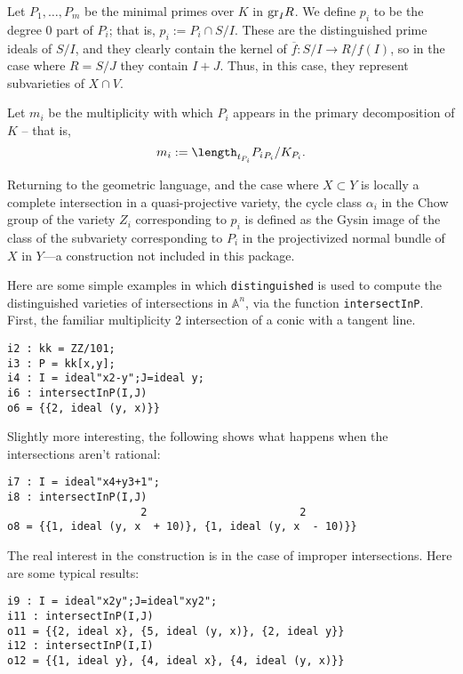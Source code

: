 \documentclass[twoside,12pt, leqno]{amsart}
\def\gr{{\rm gr}}
\begin{document}
\begin{normalsize}
Let $P_{1},\dots, P_{m}$ be the minimal primes over $K$ in $\gr_{I}R$. We define $p_{i}$ to be the degree 0 part of $P_{i}$; that is, $p_{i} := P_{i}\cap S/I$. These are the distinguished prime ideals of $S/I$, and they clearly contain the kernel of $\overline f: S/I \to R/f(I)$, so in the case where $R = S/J$ they contain $I+J$.  Thus, in this case, they  represent subvarieties
of $X\cap V$.

Let $m_{i}$ be the multiplicity with which $P_{i}$ appears in the primary decomposition of $K$ -- that is,
$$
m_{i} := \length_{t_{P_{i}}}{P_{i}}_{P_{i}}/K_{P_{i}}.
$$

Returning to the geometric language, and the case where $X\subset Y$ is locally a complete intersection in a quasi-projective variety, the cycle class $\alpha_{i}$ in the Chow group of the variety 
$Z_{i}$ corresponding to $p_{i}$ is defined as the Gysin image of the class of the subvariety corresponding
to $P_{i}$ in the projectivized normal bundle of $X$ in $Y$---a construction not included in this package. 

Here are some simple examples in which {\tt distinguished} is used to compute the distinguished varieties of
intersections in ${\mathbb A}^{n}$, via the function {\tt intersectInP}. First, the familiar multiplicity 2 intersection of a conic with a tangent line.
\begin{footnotesize}
 \begin{verbatim}
i2 : kk = ZZ/101;
i3 : P = kk[x,y];
i4 : I = ideal"x2-y";J=ideal y;
i6 : intersectInP(I,J)
o6 = {{2, ideal (y, x)}}
\end{verbatim}
\end{footnotesize}
Slightly more interesting, the following shows what happens when the intersections aren't rational:
\begin{footnotesize}
 \begin{verbatim}
i7 : I = ideal"x4+y3+1";
i8 : intersectInP(I,J)
                     2                        2
o8 = {{1, ideal (y, x  + 10)}, {1, ideal (y, x  - 10)}}
\end{verbatim}
\end{footnotesize}
The real interest in the construction is in the case of improper intersections. Here are some typical results:
\begin{footnotesize}
 \begin{verbatim}
i9 : I = ideal"x2y";J=ideal"xy2";
i11 : intersectInP(I,J)
o11 = {{2, ideal x}, {5, ideal (y, x)}, {2, ideal y}}
i12 : intersectInP(I,I)
o12 = {{1, ideal y}, {4, ideal x}, {4, ideal (y, x)}}
\end{verbatim}
\end{footnotesize}


\end{normalsize}
\end{document}
